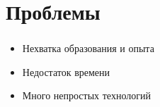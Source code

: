 \section{Проблемы}

\begin{frame}
\frametitle{\insertsection} 
    \begin{itemize}
        \item Нехватка образования и опыта
        \item Недостаток времени
        \item Много непростых технологий
    \end{itemize}
\end{frame}